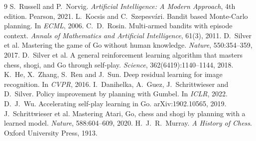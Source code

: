 \documentclass[11pt,a4paper,twocolumn]{article}
\begin{document}
\begin{thebibliography}{9}
\small
{}
S.~Russell and P.~Norvig.
\newblock \emph{Artificial Intelligence: A Modern Approach}, 4th edition.
\newblock Pearson, 2021.
L.~Kocsis and C.~Szepesv\'ari.
\newblock Bandit based Monte-Carlo planning.
\newblock In \emph{ECML}, 2006.
C.~D.~Rosin.
\newblock Multi-armed bandits with episode context.
\newblock \emph{Annals of Mathematics and Artificial Intelligence}, 61(3), 2011.
D.~Silver et al.
\newblock Mastering the game of Go without human knowledge.
\newblock \emph{Nature}, 550:354--359, 2017.
D.~Silver et al.
\newblock A general reinforcement learning algorithm that masters chess, shogi, and Go
  through self-play.
\newblock \emph{Science}, 362(6419):1140--1144, 2018.
K.~He, X.~Zhang, S.~Ren and J.~Sun.
\newblock Deep residual learning for image recognition.
\newblock In \emph{CVPR}, 2016.
I.~Danihelka, A.~Guez, J.~Schrittwieser and D.~Silver.
\newblock Policy improvement by planning with Gumbel.
\newblock In \emph{ICLR}, 2022.
D.~J.~Wu.
\newblock Accelerating self-play learning in Go.
\newblock arXiv:1902.10565, 2019.
J.~Schrittwieser et al.
\newblock Mastering Atari, Go, chess and shogi by planning with a learned model.
\newblock \emph{Nature}, 588:604--609, 2020.
H.~J.~R.~Murray.
\newblock \emph{A History of Chess}.
\newblock Oxford University Press, 1913.
\end{thebibliography}
\end{document}
